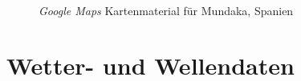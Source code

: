 \begin{figure}[h]
  \caption{\textit{Google Maps} Kartenmaterial für Mundaka, Spanien}
  \label{google-maps}
\end{figure}

\section{Wetter- und Wellendaten}
\label{sec:Wetter- und Wellendaten}

